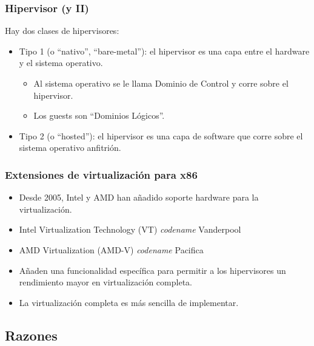 \documentclass{beamer}
\begin{document}
\begin{frame}
\frametitle{Hipervisor (y II)}

Hay dos clases de hipervisores:

\begin{itemize}
\item \alert{Tipo 1} (o ``nativo'', ``bare-metal''): el hipervisor es una capa entre el hardware y el sistema operativo. 
\begin{itemize}
\item Al sistema operativo se le llama Dominio de Control  y corre sobre el hipervisor.
\item Los guests son ``Dominios Lógicos''.
\end{itemize}

\item \alert{Tipo 2} (o ``hosted''): el hipervisor es una capa de software que corre sobre el sistema operativo anfitrión.
\end{itemize}

\end{frame}



\begin{frame}
\frametitle{Extensiones de virtualización para x86}

\begin{itemize}
\item Desde 2005, Intel y AMD han añadido soporte hardware para la virtualización.
\item Intel Virtualization Technology (VT) \textit{codename} Vanderpool
\item AMD Virtualization (AMD-V) \textit{codename} Pacifica
\item Añaden una funcionalidad específica para permitir a los hipervisores un rendimiento mayor en virtualización completa.
\item La virtualización completa es más sencilla de implementar.
\end{itemize}

\end{frame}




\subsection{Razones}
\end{document}
